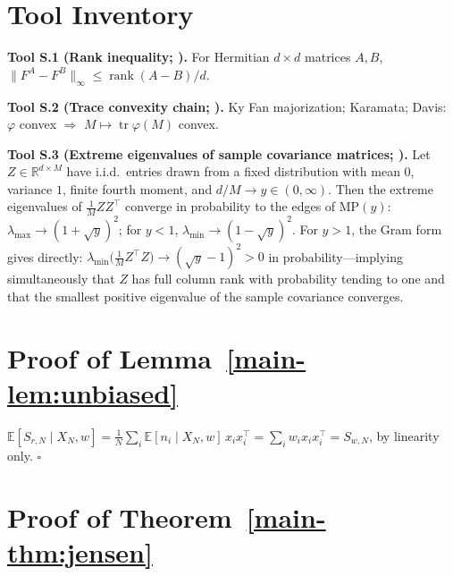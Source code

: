 
\section{Tool Inventory}\label{sec:S0}

\textbf{Tool S.1 (Rank inequality; \cite[Lemma~2.2]{bai2010spectral}).} For Hermitian $d\times d$ matrices $A,B$, $\|F^A-F^B\|_\infty\le\operatorname{rank}(A-B)/d$.

\textbf{Tool S.2 (Trace convexity chain; \cite{davis1957schwarz,fan1949theorem,karamata1932inegalite,marshall1979inequalities,bhatia1997matrix}).} Ky Fan majorization; Karamata; Davis: $\varphi$ convex $\Rightarrow$ $M\mapsto\operatorname{tr}\varphi(M)$ convex.

\textbf{Tool S.3 (Extreme eigenvalues of sample covariance matrices; \cite{bai1993limit}).} Let $Z\in\mathbb R^{d\times M}$ have i.i.d.\ entries drawn from a fixed distribution with mean $0$, variance $1$, finite fourth moment, and $d/M\to y\in(0,\infty)$. Then the extreme eigenvalues of $\frac1MZZ^\top$ converge in probability to the edges of $\mathrm{MP}(y)$: $\lambda_{\max}\to(1+\sqrt y)^2$; for $y<1$, $\lambda_{\min}\to(1-\sqrt y)^2$. For $y>1$, the Gram form gives directly: $\lambda_{\min}\big(\frac1MZ^\top Z\big)\to(\sqrt y-1)^2>0$ in probability—implying simultaneously that $Z$ has full column rank with probability tending to one and that the smallest positive eigenvalue of the sample covariance converges.

\section{Proof of Lemma~\ref{main-lem:unbiased}}\label{sec:S1}

$\mathbb E[S_{r,N}\mid X_N,w]=\frac1N\sum_i\mathbb E[n_i\mid X_N,w]\,x_ix_i^\top=\sum_iw_ix_ix_i^\top=S_{w,N}$, by linearity only. $\square$

\section{Proof of Theorem~\ref{main-thm:jensen} }\label{sec:S2}

